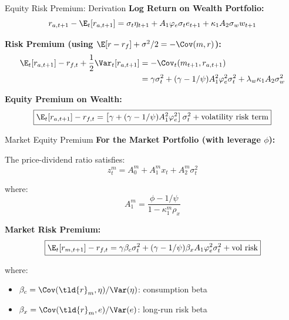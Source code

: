\documentclass{beamer}
\begin{document}
\begin{frame}{Equity Risk Premium: Derivation}
    \textbf{Log Return on Wealth Portfolio:}
    \begin{equation}
        r_{a,t+1} - \E_t[r_{a,t+1}] = \sigma_t \eta_{t+1} + A_1 \varphi_e \sigma_t e_{t+1} + \kappa_1 A_2 \sigma_w w_{t+1}
    \end{equation}
    
    \textbf{Risk Premium (using $\E[r - r_f] + \sigma^2/2 = -\Cov(m, r)$):}
    \begin{align}
        \E_t[r_{a,t+1}] - r_{f,t} + \frac{1}{2}\Var_t[r_{a,t+1}] &= -\Cov_t(m_{t+1}, r_{a,t+1}) \nonumber \\
        &= \gamma \sigma_t^2 + (\gamma - 1/\psi) A_1^2 \varphi_e^2 \sigma_t^2 + \lambda_w \kappa_1 A_2 \sigma_w^2
    \end{align}
    
    \textbf{Equity Premium on Wealth:}
    \begin{equation}
        \boxed{\E_t[r_{a,t+1}] - r_{f,t} = \left[\gamma + (\gamma - 1/\psi)A_1^2\varphi_e^2\right]\sigma_t^2 + \text{volatility risk term}}
    \end{equation}
\end{frame}

\begin{frame}{Market Equity Premium}
    \textbf{For the Market Portfolio (with leverage $\phi$):}
    
    The price-dividend ratio satisfies:
    \begin{equation}
        z_t^m = A_0^m + A_1^m x_t + A_2^m \sigma_t^2
    \end{equation}
    
    where:
    \begin{equation}
        A_1^m = \frac{\phi - 1/\psi}{1 - \kappa_1^m \rho_x}
    \end{equation}
    
    \textbf{Market Risk Premium:}
    \begin{equation}
        \boxed{\E_t[r_{m,t+1}] - r_{f,t} = \gamma \beta_c \sigma_t^2 + (\gamma - 1/\psi) \beta_x A_1 \varphi_e^2 \sigma_t^2 + \text{vol risk}}
    \end{equation}
    
    where:
    \begin{itemize}
        \item $\beta_c = \Cov(\tld{r}_m, \eta)/\Var(\eta)$: consumption beta
        \item $\beta_x = \Cov(\tld{r}_m, e)/\Var(e)$: long-run risk beta
    \end{itemize}
\end{frame}
\end{document}
